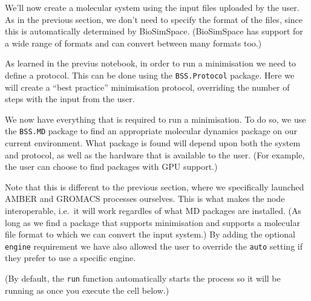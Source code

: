 We'll now create a molecular system using the input files uploaded by
the user. As in the previous section, we don't need to specify the
format of the files, since this is automatically determined by
BioSimSpace. (BioSimSpace has support for a wide range of formats and
can convert between many formats too.)

\begin{Shaded}
\begin{Highlighting}[]
\OperatorTok{=}\NormalTok{))}
\end{Highlighting}
\end{Shaded}

As learned in the previus notebook, in order to run a minimisation we
need to define a protocol. This can be done using the
\texttt{BSS.Protocol} package. Here we will create a ``best practice''
minimisation protocol, overriding the number of steps with the input
from the user.

\begin{Shaded}
\begin{Highlighting}[]
\OperatorTok{=}\OperatorTok{=}\NormalTok{))}
\end{Highlighting}
\end{Shaded}

We now have everything that is required to run a minimisation. To do so,
we use the \texttt{BSS.MD} package to find an appropriate molecular
dynamics package on our current environment. What package is found will
depend upon both the system and protocol, as well as the hardware that
is available to the user. (For example, the user can choose to find
packages with GPU support.)

Note that this is different to the previous section, where we
specifically launched AMBER and GROMACS processes ourselves. This is
what makes the node interoperable, i.e.~it will work regardles of what
MD packages are installed. (As long as we find a package that supports
minimisation and supports a molecular file format to which we can
convert the input system.) By adding the optional \texttt{engine}
requirement we have also allowed the user to override the \texttt{auto}
setting if they prefer to use a specific engine.

(By default, the \texttt{run} function automatically starts the process
so it will be running as once you execute the cell below.)


